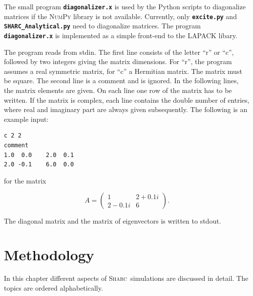 \documentclass[a4paper,11pt,DIV=15,openany,twoside=false]{scrbook}
\newcommand{\ttmdump}[1]{#1}
\newcommand{\sharc}{\textsc{Sharc}}
\newcommand{\ttt}[1]{\textbf{\texttt{#1}}}
\newenvironment{example}{
  \vspace{0mm}
  \definecolor{shadecolor}{HTML}{E4F4FF}
  \begin{shaded}
}{
  \end{shaded}
}
\begin{document}
The small program \ttt{diagonalizer.x} is used by the Python scripts to diagonalize matrices if the \textsc{NumPy} library is not available. Currently, only \ttt{excite.py} and \ttt{SHARC\_Analytical.py} need to diagonalize matrices. The program \ttt{diagonalizer.x} is implemented as a simple front-end to the LAPACK libary.

The program reads from stdin. The first line consists of the letter ``r'' or ``c'', followed by two integers giving the matrix dimensions. For ``r'', the program assumes a real symmetric matrix, for ``c'' a Hermitian matrix. The matrix must be square.
The second line is a comment and is ignored.
In the following lines, the matrix elements are given. On each line one row of the matrix has to be written. If the matrix is complex, each line contains the double number of entries, where real and imaginary part are always given subsequently.
The following is an example input:
\begin{example}
\footnotesize\begin{verbatim}
c 2 2
comment
1.0  0.0    2.0  0.1
2.0 -0.1    6.0  0.0
\end{verbatim}
\end{example}

\normalsize
for the matrix 
\ttmdump{
  \begin{equation}
    A=\begin{pmatrix}
        1 &2+0.1i\\
        2-0.1i&6
      \end{pmatrix}.\nonumber
  \end{equation}
}
The diagonal matrix and the matrix of eigenvectors is written to stdout.




\chapter{Methodology}

In this chapter different aspects of \sharc\ simulations are discussed in detail. The topics are ordered alphabetically.
\end{document}
